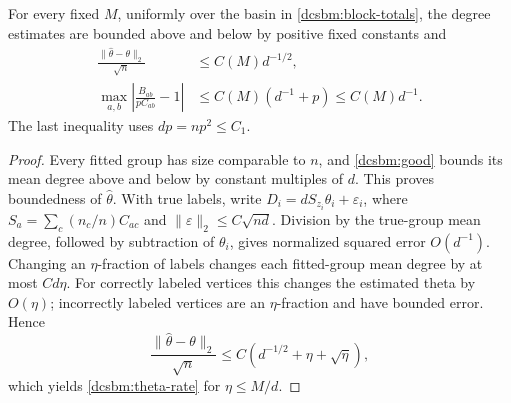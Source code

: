 \begin{lemma}
\label{dcsbm:nuisance}
For every fixed \(M\), uniformly over the basin in
\cref{dcsbm:block-totals}, the degree estimates are bounded above
and below by positive fixed constants and
\begin{align}
 \frac{\|\widehat\theta-\theta\|_2}{\sqrt n}
 &\le C(M)d^{-1/2},                                      \label{dcsbm:theta-rate}\\
 \max_{a,b}\left|\frac{\widehat B_{ab}}{pC_{ab}}-1\right|
 &\le C(M)(d^{-1}+p)\le C(M)d^{-1}.                       \label{dcsbm:B-rate}
\end{align}
The last inequality uses \(dp=np^2\le C_1\).
\end{lemma}

\begin{proof}
Every fitted group has size comparable to \(n\), and
\cref{dcsbm:good} bounds its mean degree above and below by
constant multiples of \(d\).  This proves boundedness of
\(\widehat\theta\).
With true labels, write \(D_i=dS_{z_i}\theta_i+\varepsilon_i\),
where \(S_a=\sum_c(n_c/n)C_{ac}\) and
\(\|\varepsilon\|_2\le C\sqrt{nd}\).
Division by the true-group mean degree, followed by subtraction
of \(\theta_i\), gives normalized squared error \(O(d^{-1})\).
Changing an \(\eta\)-fraction of labels changes each fitted-group
mean degree by at most \(Cd\eta\).  For correctly labeled vertices
this changes the estimated theta by \(O(\eta)\); incorrectly labeled
vertices are an \(\eta\)-fraction and have bounded error.  Hence
\[
 \frac{\|\widehat\theta-\theta\|_2}{\sqrt n}
 \le C(d^{-1/2}+\eta+\sqrt\eta),
\]
which yields \cref{dcsbm:theta-rate} for \(\eta\le M/d\).


\end{proof}
